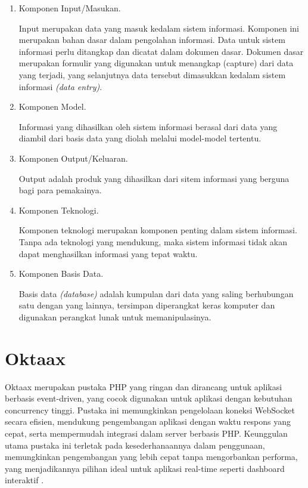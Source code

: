 	\begin{enumerate}
	  	\item Komponen Input/Masukan.
			\par Input merupakan data yang masuk kedalam sistem informasi. Komponen ini merupakan bahan dasar dalam pengolahan informasi. Data untuk sistem informasi perlu ditangkap dan dicatat dalam dokumen dasar. Dokumen dasar merupakan formulir yang digunakan untuk menangkap (capture) dari data yang terjadi, yang selanjutnya data tersebut dimasukkan kedalam sistem informasi \textit{(data entry)}.
	 	 \item Komponen Model.
			\par Informasi yang dihasilkan oleh sistem informasi berasal dari data yang diambil dari basis data yang diolah melalui model-model tertentu.
		\item Komponen Output/Keluaran.
			\par Output adalah produk yang dihasilkan dari sitem informasi yang berguna bagi para pemakainya.
	 	 \item Komponen Teknologi.
			\par Komponen teknologi merupakan komponen penting dalam sistem informasi. Tanpa ada teknologi yang mendukung, maka sistem informasi tidak akan dapat menghasilkan informasi yang tepat waktu.
		\item Komponen Basis Data.
			\par Basis data \textit{(database)} adalah kumpulan dari data yang saling berhubungan satu dengan yang lainnya, tersimpan diperangkat keras komputer dan digunakan perangkat lunak untuk memanipulasinya.
	\end{enumerate}
\section{Oktaax}
\par Oktaax merupakan pustaka PHP yang ringan dan dirancang untuk aplikasi berbasis event-driven, yang cocok digunakan untuk aplikasi dengan kebutuhan concurrency tinggi. Pustaka ini memungkinkan pengelolaan koneksi WebSocket secara efisien, mendukung pengembangan aplikasi dengan waktu respons yang cepat, serta mempermudah integrasi dalam server berbasis PHP. Keunggulan utama pustaka ini terletak pada kesederhanaannya dalam penggunaan, memungkinkan pengembangan yang lebih cepat tanpa mengorbankan performa, yang menjadikannya pilihan ideal untuk aplikasi real-time seperti dashboard interaktif \citep{rosyida2021swoole}.
